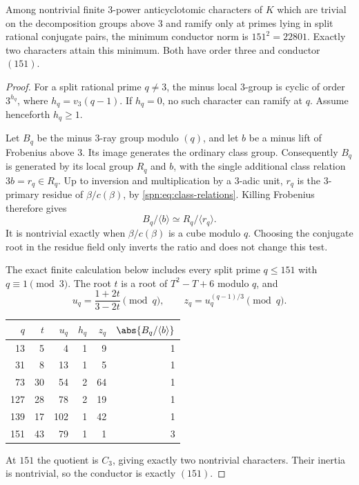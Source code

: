 \begin{theorem}\label{spn:thm:minimum}
Among nontrivial finite $3$-power anticyclotomic characters of $K$ which are
trivial on the decomposition groups above $3$ and ramify only at primes lying
in split rational conjugate pairs, the minimum conductor norm is
$151^2=22801$. Exactly two characters attain this minimum. Both have order
three and conductor $(151)$.
\end{theorem}

\begin{proof}
For a split rational prime $q\ne3$, the minus local $3$-group is cyclic of
order $3^{h_q}$, where $h_q=v_3(q-1)$. If $h_q=0$, no such character can
ramify at $q$. Assume henceforth $h_q\ge1$.

Let $B_q$ be the minus $3$-ray group modulo $(q)$, and let $b$ be a minus
lift of Frobenius above $3$. Its image generates the ordinary class group.
Consequently $B_q$ is generated by its local group $R_q$ and $b$, with the
single additional class relation $3b=r_q\in R_q$. Up to inversion and
multiplication by a $3$-adic unit, $r_q$ is the $3$-primary residue of
$\beta/c(\beta)$, by \eqref{spn:eq:class-relations}. Killing Frobenius
therefore gives
\begin{equation}\label{spn:eq:ray-quotient}
 B_q/\langle b\rangle\simeq R_q/\langle r_q\rangle .
\end{equation}
It is nontrivial exactly when $\beta/c(\beta)$ is a cube modulo $q$. Choosing the conjugate root in the residue field only inverts the ratio
and does not change this test.

The exact finite calculation below includes every split prime $q\le151$ with
$q\equiv1\pmod3$. The root $t$ is a root of $T^2-T+6$ modulo $q$, and
\[
 u_q=\frac{1+2t}{3-2t}\pmod q,\qquad z_q=u_q^{(q-1)/3}\pmod q .
\]
\begin{center}
\begin{tabular}{rrrrrr}
\toprule
$q$ & $t$ & $u_q$ & $h_q$ & $z_q$ & $\abs{B_q/\langle b\rangle}$\\
\midrule
13  &5 &4  &1&9 &1\\
31  &8 &13 &1&5 &1\\
73  &30&54 &2&64&1\\
127 &28&78 &2&19&1\\
139 &17&102&1&42&1\\
151 &43&79 &1&1 &3\\
\bottomrule
\end{tabular}
\end{center}
At $151$ the quotient is $C_3$, giving exactly two nontrivial characters.
Their inertia is nontrivial, so the conductor is exactly $(151)$.


\end{proof}
